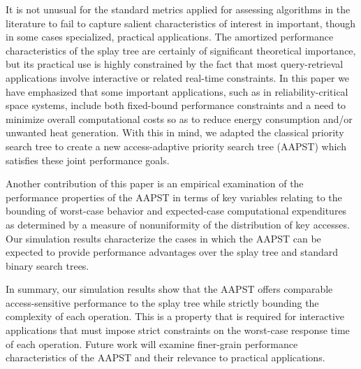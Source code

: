 \documentclass{article}
\begin{document}
It is not unusual for the standard metrics applied for assessing algorithms in the literature to fail to capture salient characteristics of interest in important, though in some cases specialized, practical applications. The amortized performance characteristics of the splay tree are certainly of significant theoretical importance, but its practical use is highly constrained by the fact that most query-retrieval applications involve interactive or related real-time constraints. In this paper we have emphasized that some important applications, such as in reliability-critical space systems, include both fixed-bound performance constraints and a need to minimize overall computational costs so as to reduce energy consumption and/or unwanted heat generation. With this in mind, we adapted the classical priority search tree to create a new access-adaptive priority search tree (AAPST) which satisfies these joint performance goals.

Another contribution of this paper is an empirical examination of the performance properties of the AAPST in terms of key variables relating to the bounding of worst-case behavior and expected-case computational expenditures as determined by a measure of nonuniformity of the distribution of key accesses. Our simulation results characterize the cases in which the AAPST can be expected to provide performance advantages over the splay tree and standard binary search trees.    

In summary, our simulation results show that the AAPST offers comparable access-sensitive performance to the splay tree while strictly bounding the complexity of each operation. This is a property that is required for interactive applications that must impose strict constraints on the worst-case response time of each operation. Future work will examine finer-grain performance characteristics of the AAPST and their relevance to practical applications.
\end{document}
